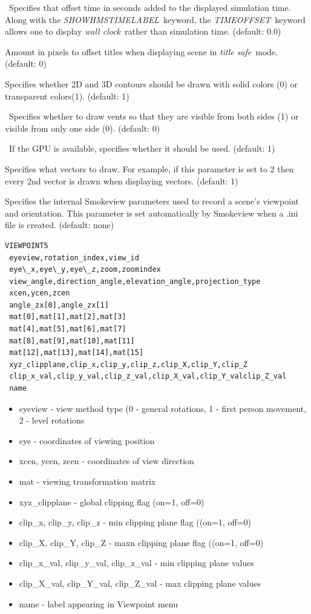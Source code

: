 \documentclass[11pt,twoside]{book}
\begin{document}
\ Specifies that offset time in seconds added to
the displayed simulation time.  Along with the {\em
SHOWHMSTIMELABEL}\ keyword, the {\em TIMEOFFSET}\ keyword allows
one to display {\em wall clock}\ rather than simulation time.
(default: 0.0)

Amount in pixels to offset titles when displaying
scene in {\em title safe}\ mode.   (default: 0)

Specifies whether 2D and 3D contours should be
drawn with solid colors (0) or transparent colors(1). (default: 1)

\  Specifies whether to draw vents so that they are visible from
both sides (1) or visible from only one side (0).  (default: 0)

\ If the GPU is available, specifies whether it should be used. (default: 1)

Specifies
what vectors to draw.  For example, if this parameter is set to 2 then
every 2nd vector is drawn when displaying vectors.
(default: 1)

Specifies the internal Smokeview parameters used
to record a scene's viewpoint and orientation.  This parameter is
set automatically by Smokeview when a .ini file is created.
(default: none)

{\small
\begin{lstlisting}
VIEWPOINT5
 eyeview,rotation_index,view_id
 eye\_x,eye\_y,eye\_z,zoom,zoomindex
 view_angle,direction_angle,elevation_angle,projection_type
 xcen,ycen,zcen
 angle_zx[0],angle_zx[1]
 mat[0],mat[1],mat[2],mat[3]
 mat[4],mat[5],mat[6],mat[7]
 mat[8],mat[9],mat[10],mat[11]
 mat[12],mat[13],mat[14],mat[15]
 xyz_clipplane,clip_x,clip_y,clip_z,clip_X,clip_Y,clip_Z
 clip_x_val,clip_y_val,clip_z_val,clip_X_val,clip_Y_valclip_Z_val
 name
\end{lstlisting}
}

\begin{itemize}
\item eyeview - view method type (0 - general rotations,
1 - first person movement, 2 - level rotations
\item eye - coordinates of viewing position
\item xcen, ycen, zcen - coordinates of view direction
\item mat - viewing transformation matrix
\item xyz\_clipplane - global clipping flag (on=1, off=0)
\item clip\_x, clip\_y, clip\_z - min clipping plane flag ((on=1, off=0)
\item clip\_X, clip\_Y, clip\_Z - maxn clipping plane flag ((on=1, off=0)
\item clip\_x\_val, clip\_y\_val, clip\_z\_val - min clipping plane values
\item clip\_X\_val, clip\_Y\_val, clip\_Z\_val - max clipping plane values
\item name - label appearing in Viewpoint menu
\end{itemize}
\end{document}
